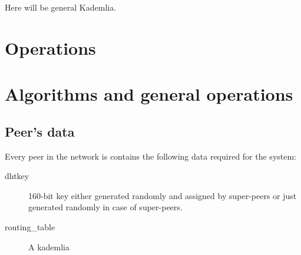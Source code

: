 Here will be general Kademlia.

\section{Operations}

\section{Algorithms and general operations}

\subsection{Peer's data}
Every peer in the network is contains the following data required for the
system:

\begin{description}
  \item[dhtkey] 160-bit key either generated randomly and assigned by
    super-peers or just generated randomly in case of super-peers.
  \item[routing\_table] A kademlia
\end{description}

